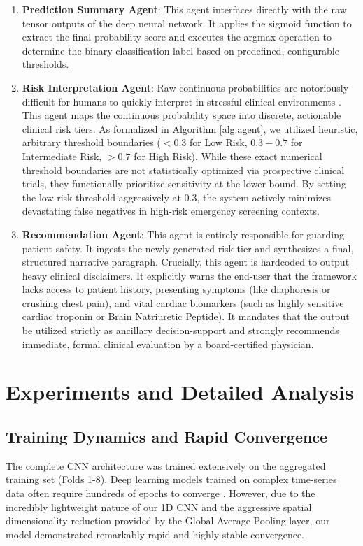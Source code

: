 \documentclass[10pt,twocolumn,letterpaper]{article}
\begin{document}
\begin{enumerate}
    \item \textbf{Prediction Summary Agent}: This agent interfaces directly with the raw tensor outputs of the deep neural network. It applies the sigmoid function to extract the final probability score and executes the argmax operation to determine the binary classification label based on predefined, configurable thresholds.
    \item \textbf{Risk Interpretation Agent}: Raw continuous probabilities are notoriously difficult for humans to quickly interpret in stressful clinical environments \cite{sengupta2020cognitive}. This agent maps the continuous probability space into discrete, actionable clinical risk tiers. As formalized in Algorithm \ref{alg:agent}, we utilized heuristic, arbitrary threshold boundaries ($< 0.3$ for Low Risk, $0.3 - 0.7$ for Intermediate Risk, $> 0.7$ for High Risk). While these exact numerical threshold boundaries are not statistically optimized via prospective clinical trials, they functionally prioritize sensitivity at the lower bound. By setting the low-risk threshold aggressively at 0.3, the system actively minimizes devastating false negatives in high-risk emergency screening contexts.
    \item \textbf{Recommendation Agent}: This agent is entirely responsible for guarding patient safety. It ingests the newly generated risk tier and synthesizes a final, structured narrative paragraph. Crucially, this agent is hardcoded to output heavy clinical disclaimers. It explicitly warns the end-user that the framework lacks access to patient history, presenting symptoms (like diaphoresis or crushing chest pain), and vital cardiac biomarkers (such as highly sensitive cardiac troponin or Brain Natriuretic Peptide). It mandates that the output be utilized strictly as ancillary decision-support and strongly recommends immediate, formal clinical evaluation by a board-certified physician.
\end{enumerate}

\section{Experiments and Detailed Analysis}

\subsection{Training Dynamics and Rapid Convergence}
The complete CNN architecture was trained extensively on the aggregated training set (Folds 1-8). Deep learning models trained on complex time-series data often require hundreds of epochs to converge \cite{he2016deep, szegedy2015going}. However, due to the incredibly lightweight nature of our 1D CNN and the aggressive spatial dimensionality reduction provided by the Global Average Pooling layer, our model demonstrated remarkably rapid and highly stable convergence. 
\end{document}
